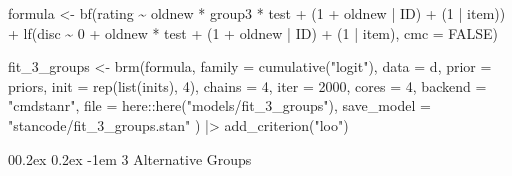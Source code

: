 \documentclass[
  man,floatsintext]{apa7}
\makeatletter
\newenvironment{Shaded}{\begin{snugshade}}{\end{snugshade}}
\newcommand{\AttributeTok}[1]{\textcolor[rgb]{0.77,0.63,0.00}{#1}}
\newcommand{\ConstantTok}[1]{\textcolor[rgb]{0.00,0.00,0.00}{#1}}
\newcommand{\DecValTok}[1]{\textcolor[rgb]{0.00,0.00,0.81}{#1}}
\newcommand{\FunctionTok}[1]{\textcolor[rgb]{0.00,0.00,0.00}{#1}}
\newcommand{\NormalTok}[1]{#1}
\newcommand{\OtherTok}[1]{\textcolor[rgb]{0.56,0.35,0.01}{#1}}
\newcommand{\SpecialCharTok}[1]{\textcolor[rgb]{0.00,0.00,0.00}{#1}}
\newcommand{\StringTok}[1]{\textcolor[rgb]{0.31,0.60,0.02}{#1}}
\let\oldparagraph\paragraph
\renewcommand{\paragraph}[1]{\oldparagraph{#1}\mbox{}}
\renewcommand{\paragraph}{\@startsection{paragraph}{4}{\parindent}%
  {0\baselineskip \@plus 0.2ex \@minus 0.2ex}%
  {-1em}%
  {\normalfont\normalsize\bfseries\itshape\typesectitle}}
\renewcommand{\paragraph}{\@startsection{paragraph}{4}{\parindent}%
  {0\baselineskip \@plus 0.2ex \@minus 0.2ex}%
  {-1em}%
  {\normalfont\normalsize\bfseries\typesectitle}}
\makeatother
\begin{document}
\begin{Shaded}
\begin{Highlighting}[]
\NormalTok{formula }\OtherTok{\textless{}{-}} \FunctionTok{bf}\NormalTok{(rating }\SpecialCharTok{\textasciitilde{}}\NormalTok{ oldnew }\SpecialCharTok{*}\NormalTok{ group3 }\SpecialCharTok{*}\NormalTok{ test }\SpecialCharTok{+}
\NormalTok{  (}\DecValTok{1} \SpecialCharTok{+}\NormalTok{ oldnew }\SpecialCharTok{|}\NormalTok{ ID) }\SpecialCharTok{+}\NormalTok{ (}\DecValTok{1} \SpecialCharTok{|}\NormalTok{ item)) }\SpecialCharTok{+}
  \FunctionTok{lf}\NormalTok{(disc }\SpecialCharTok{\textasciitilde{}} \DecValTok{0} \SpecialCharTok{+}\NormalTok{ oldnew }\SpecialCharTok{*}\NormalTok{ test }\SpecialCharTok{+}
\NormalTok{    (}\DecValTok{1} \SpecialCharTok{+}\NormalTok{ oldnew }\SpecialCharTok{|}\NormalTok{ ID) }\SpecialCharTok{+}\NormalTok{ (}\DecValTok{1} \SpecialCharTok{|}\NormalTok{ item), }\AttributeTok{cmc =} \ConstantTok{FALSE}\NormalTok{)}

\NormalTok{fit\_3\_groups }\OtherTok{\textless{}{-}} \FunctionTok{brm}\NormalTok{(formula,}
  \AttributeTok{family =} \FunctionTok{cumulative}\NormalTok{(}\StringTok{"logit"}\NormalTok{),}
  \AttributeTok{data =}\NormalTok{ d,}
  \AttributeTok{prior =}\NormalTok{ priors,}
  \AttributeTok{init =} \FunctionTok{rep}\NormalTok{(}\FunctionTok{list}\NormalTok{(inits), }\DecValTok{4}\NormalTok{),}
  \AttributeTok{chains =} \DecValTok{4}\NormalTok{, }\AttributeTok{iter =} \DecValTok{2000}\NormalTok{, }\AttributeTok{cores =} \DecValTok{4}\NormalTok{,}
  \AttributeTok{backend =} \StringTok{"cmdstanr"}\NormalTok{,}
  \AttributeTok{file =}\NormalTok{ here}\SpecialCharTok{::}\FunctionTok{here}\NormalTok{(}\StringTok{"models/fit\_3\_groups"}\NormalTok{),}
  \AttributeTok{save\_model =} \StringTok{"stancode/fit\_3\_groups.stan"}
\NormalTok{) }\SpecialCharTok{|\textgreater{}}
  \FunctionTok{add\_criterion}\NormalTok{(}\StringTok{"loo"}\NormalTok{)}
\end{Highlighting}
\end{Shaded}

\hypertarget{alternative-groups}{%
\paragraph{3 Alternative Groups}\label{alternative-groups}}
\end{document}
